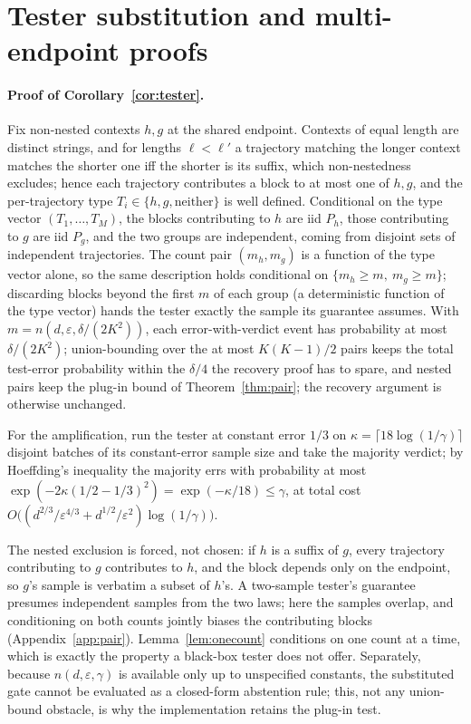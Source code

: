 \documentclass{article}
\newcommand{\eps}{\varepsilon}
\begin{document}
\section{Tester substitution and multi-endpoint proofs}\label{app:tester}

\paragraph{Proof of Corollary~\ref{cor:tester}.}
Fix non-nested contexts $h,g$ at the shared endpoint.  Contexts of equal
length are distinct strings, and for lengths $\ell<\ell'$ a trajectory
matching the longer context matches the shorter one iff the shorter is its
suffix, which non-nestedness excludes; hence each trajectory contributes a
block to at most one of $h,g$, and the per-trajectory type
$T_i\in\{h,g,\text{neither}\}$ is well defined.  Conditional on the type
vector $(T_1,\dots,T_M)$, the blocks contributing to $h$ are iid $P_h$,
those contributing to $g$ are iid $P_g$, and the two groups are
independent, coming from disjoint sets of independent trajectories.  The
count pair $(m_h,m_g)$ is a function of the type vector alone, so the same
description holds conditional on $\{m_h\ge m,\ m_g\ge m\}$; discarding
blocks beyond the first $m$ of each group (a deterministic function of the
type vector) hands the tester exactly the sample its guarantee assumes.
With
$m=n(d,\eps,\delta/(2K^2))$, each error-with-verdict event has probability
at most $\delta/(2K^2)$; union-bounding over the at most $K(K-1)/2$ pairs
keeps the total test-error probability within the $\delta/4$ the recovery
proof has to spare, and nested pairs keep the plug-in bound of
Theorem~\ref{thm:pair}; the recovery argument is otherwise unchanged.

For the amplification, run the tester at constant error $1/3$ on
$\kappa=\lceil18\log(1/\gamma)\rceil$ disjoint batches of its
constant-error sample size and take the majority verdict; by Hoeffding's
inequality the majority errs with probability at most
$\exp(-2\kappa(1/2-1/3)^2)=\exp(-\kappa/18)\le\gamma$, at total cost
$O\bigl((d^{2/3}/\eps^{4/3}+d^{1/2}/\eps^{2})\log(1/\gamma)\bigr)$.

The nested exclusion is forced, not chosen: if $h$ is a suffix of $g$,
every trajectory contributing to $g$ contributes to $h$, and the block
depends only on the endpoint, so $g$'s sample is verbatim a subset of
$h$'s.  A two-sample tester's guarantee presumes independent samples from
the two laws; here the samples overlap, and conditioning on both counts
jointly biases the contributing blocks (Appendix~\ref{app:pair}).
Lemma~\ref{lem:onecount} conditions on one count at a time, which is
exactly the property a black-box tester does not offer.  Separately,
because $n(d,\eps,\gamma)$ is available only up to unspecified constants,
the substituted gate cannot be evaluated as a closed-form abstention rule;
this, not any union-bound obstacle, is why the implementation retains the
plug-in test.
\end{document}
